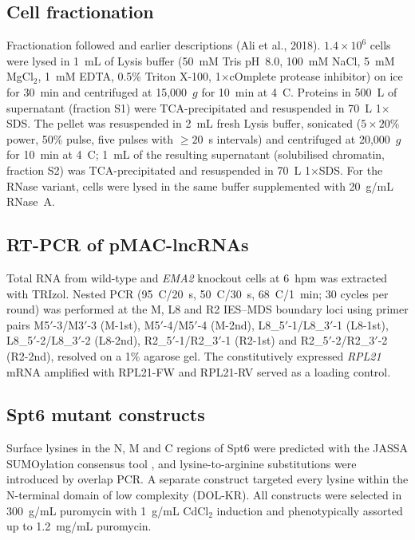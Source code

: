 \documentclass[11pt]{article}
\begin{document}
\subsection{Cell fractionation}
Fractionation followed \citet{aronica2008ema1} and earlier descriptions
(Ali et al., 2018). $1.4\times10^6$ cells were lysed in 1~mL of Lysis
buffer (50~mM Tris pH~8.0, 100~mM NaCl, 5~mM MgCl$_2$, 1~mM EDTA,
0.5\% Triton X-100, 1$\times$cOmplete protease inhibitor) on ice for
30~min and centrifuged at 15{,}000~$g$ for 10~min at 4~\textdegree C.
Proteins in 500~\textmu L of supernatant (fraction S1) were TCA-precipitated
and resuspended in 70~\textmu L 1$\times$SDS. The pellet was resuspended in
2~mL fresh Lysis buffer, sonicated ($5\times20\%$ power, 50\% pulse, five
pulses with $\geq20$~s intervals) and centrifuged at 20{,}000~$g$ for
10~min at 4~\textdegree C; 1~mL of the resulting supernatant (solubilised
chromatin, fraction S2) was TCA-precipitated and resuspended in
70~\textmu L 1$\times$SDS. For the RNase variant, cells were lysed in the
same buffer supplemented with 20~\textmu g/mL RNase~A.

\subsection{RT-PCR of pMAC-lncRNAs}
Total RNA from wild-type and \emph{EMA2} knockout cells at 6~hpm was
extracted with TRIzol. Nested PCR (95~\textdegree C/20~s,
50~\textdegree C/30~s, 68~\textdegree C/1~min; 30 cycles per round) was
performed at the M, L8 and R2 IES--MDS boundary loci using primer pairs
M5$'$-3/M3$'$-3 (M-1st), M5$'$-4/M5$'$-4 (M-2nd), L8\_5$'$-1/L8\_3$'$-1
(L8-1st), L8\_5$'$-2/L8\_3$'$-2 (L8-2nd), R2\_5$'$-1/R2\_3$'$-1 (R2-1st)
and R2\_5$'$-2/R2\_3$'$-2 (R2-2nd), resolved on a 1\% agarose gel. The
constitutively expressed \emph{RPL21} mRNA amplified with RPL21-FW and
RPL21-RV served as a loading control.

\subsection{Spt6 mutant constructs}
Surface lysines in the N, M and C regions of Spt6 were predicted with
the JASSA SUMOylation consensus tool \citep{ninova2019suvar}, and
lysine-to-arginine substitutions were introduced by overlap PCR. A
separate construct targeted every lysine within the N-terminal domain of
low complexity (DOL-KR). All constructs were selected in 300~\textmu g/mL
puromycin with 1~\textmu g/mL CdCl$_2$ induction and phenotypically
assorted up to 1.2~mg/mL puromycin.
\end{document}
